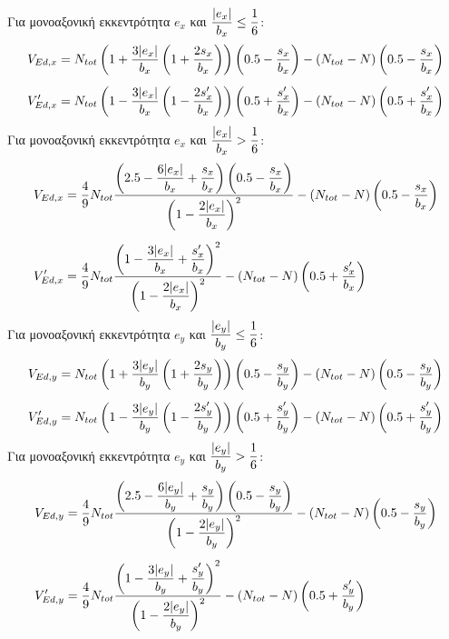 \noindent
Για μονοαξονική εκκεντρότητα $e_x$ και $\dfrac{\lvert e_x\rvert}{b_x} \leq \dfrac{1}{6}$:
\begin{subequations}
\begin{align}
  V_{Ed,x} & = N_{tot}\left(1 + \dfrac{3\lvert e_x\rvert}{b_x}\left(1 + \dfrac{2s_x}{b_x}\right)\right)\left(0.5 - \dfrac{s_x}{b_x}\right) - \left(N_{tot} - N\right)\left(0.5 - \dfrac{s_x}{b_x}\right) \label{eqn:23a} \\[5pt]
  V'_{Ed,x} & = N_{tot}\left(1 - \dfrac{3\lvert e_x\rvert}{b_x}\left(1 - \dfrac{2s'_x}{b_x}\right)\right)\left(0.5 + \dfrac{s'_x}{b_x}\right) - \left(N_{tot} - N\right)\left(0.5 + \dfrac{s'_x}{b_x}\right) \label{eqn:23b}
\end{align}
\end{subequations}
Για μονοαξονική εκκεντρότητα $e_x$ και $\dfrac{\lvert e_x\rvert}{b_x} > \dfrac{1}{6}$:
\begin{subequations}
\begin{align}
  V_{Ed,x} & = \dfrac{4}{9}N_{tot}\dfrac{\left(2.5 - \dfrac{6\lvert e_x\rvert}{b_x} + \dfrac{s_x}{b_x}\right)\left(0.5 - \dfrac{s_x}{b_x}\right)}{\left(1-\dfrac{2\lvert e_x\rvert}{b_x}\right)^2} - \left(N_{tot} - N\right)\left(0.5 - \dfrac{s_x}{b_x}\right) \label{eqn:24a} \\[5pt]
  V'_{Ed,x} & = \dfrac{4}{9}N_{tot}\dfrac{\left(1 - \dfrac{3\lvert e_x\rvert}{b_x} + \dfrac{s'_x}{b_x}\right)^2}{\left(1-\dfrac{2\lvert e_x\rvert}{b_x}\right)^2} - \left(N_{tot} - N\right)\left(0.5 + \dfrac{s'_x}{b_x}\right) \label{eqn:24b}
\end{align}
\end{subequations}
Για μονοαξονική εκκεντρότητα $e_y$ και $\dfrac{\lvert e_y\rvert}{b_y} \leq \dfrac{1}{6}$:
\begin{subequations}
\begin{align}
  V_{Ed,y} & = N_{tot}\left(1 + \dfrac{3\lvert e_y\rvert}{b_y}\left(1 + \dfrac{2s_y}{b_y}\right)\right)\left(0.5 - \dfrac{s_y}{b_y}\right) - \left(N_{tot} - N\right)\left(0.5 - \dfrac{s_y}{b_y}\right) \label{eqn:25a} \\[5pt]
  V'_{Ed,y} & = N_{tot}\left(1 - \dfrac{3\lvert e_y\rvert}{b_y}\left(1 - \dfrac{2s'_y}{b_y}\right)\right)\left(0.5 + \dfrac{s'_y}{b_y}\right) - \left(N_{tot} - N\right)\left(0.5 + \dfrac{s'_y}{b_y}\right) \label{eqn:25b}
\end{align}
\end{subequations}
Για μονοαξονική εκκεντρότητα $e_y$ και $\dfrac{\lvert e_y\rvert}{b_y} > \dfrac{1}{6}$:
\begin{subequations}
\begin{align}
  V_{Ed,y} & = \dfrac{4}{9}N_{tot}\dfrac{\left(2.5 - \dfrac{6\lvert e_y\rvert}{b_y} + \dfrac{s_y}{b_y}\right)\left(0.5 - \dfrac{s_y}{b_y}\right)}{\left(1-\dfrac{2\lvert e_y\rvert}{b_y}\right)^2} - \left(N_{tot} - N\right)\left(0.5 - \dfrac{s_y}{b_y}\right) \label{eqn:26a} \\[5pt]
  V'_{Ed,y} & = \dfrac{4}{9}N_{tot}\dfrac{\left(1 - \dfrac{3\lvert e_y\rvert}{b_y} + \dfrac{s'_y}{b_y}\right)^2}{\left(1-\dfrac{2\lvert e_y\rvert}{b_y}\right)^2} - \left(N_{tot} - N\right)\left(0.5 + \dfrac{s'_y}{b_y}\right) \label{eqn:26b}
\end{align}
\end{subequations}
